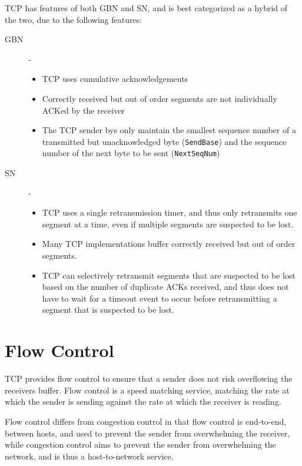 \documentclass[12pt letter]{report}
\begin{document}
TCP has features of both GBN and SN, and is best categorized as a
hybrid of the two, due to the following features:
\begin{description}
  \item[GBN]-
    \begin{itemize}
      \item TCP uses cumulative acknowledgements
      \item Correctly received but out of order segments are not
        individually ACKed by the receiver
      \item The TCP sender bys only maintain the smallest sequence
        number of a transmitted but unacknowledged byte
        (\lstinline{SendBase}) and the sequence number of the next
        byte to be sent (\lstinline{NextSeqNum})
    \end{itemize}
  \item[SN] -
    \begin{itemize}
      \item TCP uses a single retransmission timer, and thus only retransmits
        one segment at a time, even if multiple segments are suspected
        to be lost.
      \item Many TCP implementations buffer correctly received but
        out of order segments.
      \item TCP can selectively retransmit segments that are
        suspected to be lost based on the
        number of duplicate ACKs received, and thus does not have to
        wait for a timeout event to occur before retransmitting a
        segment that is suspected to be lost.
    \end{itemize}
\end{description}

\section{Flow Control}

TCP provides flow control to ensure that a sender does not risk
overflowing the receivers buffer. Flow control is a speed matching
service, matching the rate at which the sender is sending against the
rate at which the receiver is reading.

Flow control differs from congestion control in that flow control is
end-to-end, between hosts, and used to prevent the sender from
overwhelming the receiver, while congestion control aims to prevent
the sender from overwhelming the network, and is thus a host-to-network service.
\end{document}
